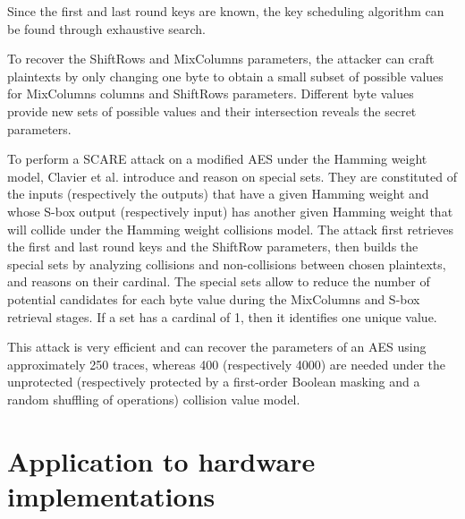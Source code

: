 \documentclass[11pt]{sdm}
\begin{document}
Since the first and last round keys are known, the key scheduling algorithm can be found through exhaustive search.

To recover the ShiftRows and MixColumns parameters, the attacker can craft plaintexts by only changing one byte to obtain a small subset of possible values for MixColumns columns and ShiftRows parameters.
Different byte values provide new sets of possible values and their intersection reveals the secret parameters.

\smallbreak
To perform a SCARE attack on a modified AES under the Hamming weight model, Clavier et al. introduce and reason on special sets.
They are constituted of the inputs (respectively the outputs) that have a given Hamming weight and whose S-box output (respectively input) has another given Hamming weight that will collide under the Hamming weight collisions model.
The attack first retrieves the first and last round keys and the ShiftRow parameters, then builds the special sets by analyzing collisions and non-collisions between chosen plaintexts, and reasons on their cardinal.
The special sets allow to reduce the number of potential candidates for each byte value during the MixColumns and S-box retrieval stages.
If a set has a cardinal of 1, then it identifies one unique value.

This attack is very efficient and can recover the parameters of an AES using approximately 250 traces, whereas 400 (respectively 4000) are needed under the unprotected (respectively protected by a first-order Boolean masking and a random shuffling of operations) collision value model.





\section{Application to hardware implementations}
\end{document}
